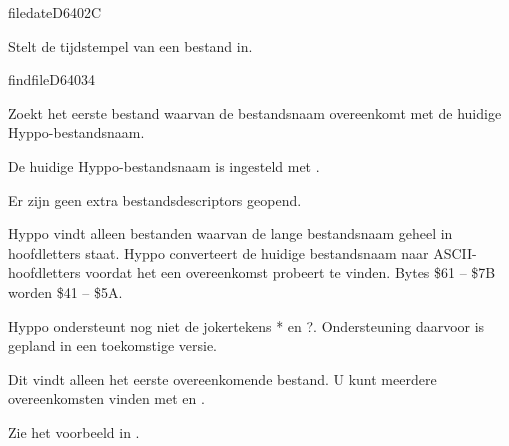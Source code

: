 \newpage
\begin{hyppotrap}{filedate}{D640}{2C}
\item [Dienst:]  Stelt de tijdstempel van een bestand in.
\notimplemented
\end{hyppotrap}


%
\newpage
\begin{hyppotrap}{findfile}{D640}{34}

\item [Dienst:]  Zoekt het eerste bestand waarvan de bestandsnaam overeenkomt met de huidige Hyppo-bestandsnaam.
\item [Voorbeding:]  De huidige Hyppo-bestandsnaam is ingesteld met .
\item [Nawerking:]  Er zijn geen extra bestandsdescriptors geopend.
\item [Foutcodes:]  
\item [Geschiedenis:]
\item [Opmerkingen:]
  Hyppo vindt alleen bestanden waarvan de lange bestandsnaam geheel in hoofdletters staat. Hyppo converteert de huidige bestandsnaam naar ASCII-hoofdletters voordat het een overeenkomst probeert te vinden. Bytes \$61 -- \$7B worden \$41 -- \$5A.

  Hyppo ondersteunt nog niet de jokertekens * en ?. Ondersteuning daarvoor is gepland in een toekomstige versie.

  Dit vindt alleen het eerste overeenkomende bestand. U kunt meerdere overeenkomsten vinden met  en .\item [Voorbeeld:]  Zie het voorbeeld in .
\end{hyppotrap}


